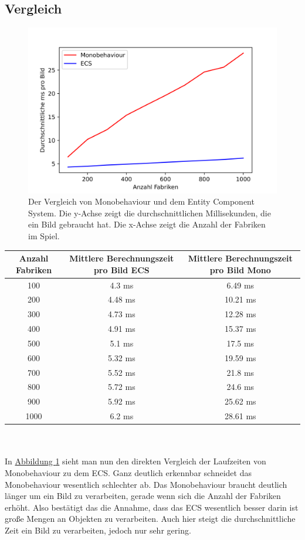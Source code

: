 \subsection{Vergleich}
\begin{figure}[H]
\centering
\includegraphics[scale=1]{Bilder/Benchmark.png}
\caption{Der Vergleich von Monobehaviour und dem Entity Component System. Die y-Achse zeigt die durchschnittlichen Millisekunden, die ein Bild gebraucht hat. Die x-Achse zeigt die Anzahl der Fabriken im Spiel.}
\label{fig:benchmark}
\end{figure}
\begin{tabular}[h]{c|c|c}
Anzahl Fabriken & Mittlere Berechnungszeit pro Bild ECS & Mittlere Berechnungszeit pro Bild Mono\\
\hline
100 & 4.3 ms & 6.49 ms\\
200 & 4.48 ms & 10.21 ms\\
300 & 4.73 ms & 12.28 ms\\
400 & 4.91 ms & 15.37 ms\\
500 & 5.1 ms & 17.5 ms\\
600 & 5.32 ms & 19.59 ms\\
700 & 5.52 ms & 21.8 ms\\
800 & 5.72 ms & 24.6 ms\\
900 & 5.92 ms & 25.62 ms\\
1000 & 6.2 ms & 28.61 ms\\
\end{tabular}
\\\\
In \hyperref[fig:benchmark]{Abbildung \ref*{fig:benchmark}} sieht man nun den direkten Vergleich der Laufzeiten von Monobehaviour zu dem ECS. Ganz deutlich erkennbar schneidet das Monobehaviour wesentlich schlechter ab. Das Monobehaviour braucht deutlich länger um ein Bild zu verarbeiten, gerade wenn sich die Anzahl der Fabriken erhöht. Also bestätigt das die Annahme, dass das ECS wesentlich besser darin ist große Mengen an Objekten zu verarbeiten. Auch hier steigt die durchschnittliche Zeit ein Bild zu verarbeiten, jedoch nur sehr gering. 